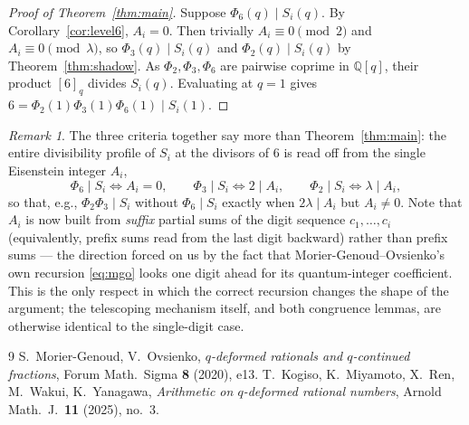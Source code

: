 \documentclass[11pt]{article}
\theoremstyle{remark}
\newtheorem{remark}[theorem]{Remark}
\newcommand{\Q}{\mathbb{Q}}
\begin{document}
\begin{proof}[Proof of Theorem~\ref{thm:main}]
Suppose $\Phi_6(q)\mid S_i(q)$. By Corollary~\ref{cor:level6}, $A_i=0$. Then trivially
$A_i\equiv0\pmod2$ and $A_i\equiv0\pmod\lambda$, so $\Phi_3(q)\mid S_i(q)$ and $\Phi_2(q)\mid
S_i(q)$ by Theorem~\ref{thm:shadow}. As $\Phi_2,\Phi_3,\Phi_6$ are pairwise coprime in $\Q[q]$,
their product $[6]_q$ divides $S_i(q)$. Evaluating at $q=1$ gives
$6=\Phi_2(1)\Phi_3(1)\Phi_6(1)\mid S_i(1)$.
\end{proof}

\begin{remark}
The three criteria together say more than Theorem~\ref{thm:main}: the entire divisibility
profile of $S_i$ at the divisors of $6$ is read off from the single Eisenstein integer $A_i$,
\[
\Phi_6\mid S_i\iff A_i=0,\qquad \Phi_3\mid S_i\iff2\mid A_i,\qquad \Phi_2\mid S_i\iff\lambda\mid A_i,
\]
so that, e.g., $\Phi_2\Phi_3\mid S_i$ without $\Phi_6\mid S_i$ exactly when $2\lambda\mid A_i$
but $A_i\neq0$. Note that $A_i$ is now built from \emph{suffix} partial sums of the digit
sequence $c_1,\dots,c_i$ (equivalently, prefix sums read from the last digit backward) rather
than prefix sums --- the direction forced on us by the fact that Morier-Genoud--Ovsienko's own
recursion \eqref{eq:mgo} looks one digit ahead for its quantum-integer coefficient. This is the
only respect in which the correct recursion changes the shape of the argument; the telescoping
mechanism itself, and both congruence lemmas, are otherwise identical to the single-digit case.
\end{remark}

\begin{thebibliography}{9}
 S.~Morier-Genoud, V.~Ovsienko, \emph{$q$-deformed rationals and
$q$-continued fractions}, Forum Math.\ Sigma \textbf{8} (2020), e13.
 T.~Kogiso, K.~Miyamoto, X.~Ren, M.~Wakui, K.~Yanagawa, \emph{Arithmetic on
$q$-deformed rational numbers}, Arnold Math.\ J.\ \textbf{11} (2025), no.~3.
\end{thebibliography}
\end{document}
